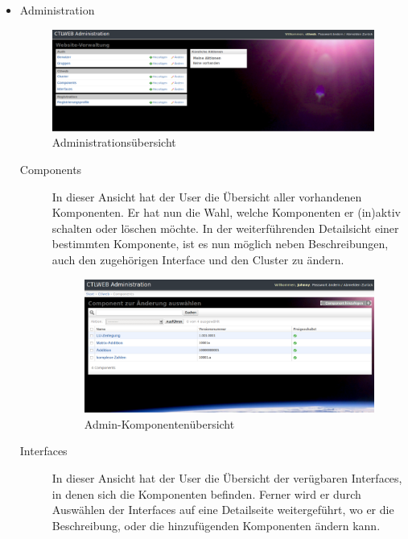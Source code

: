 \begin{itemize}
\begin{description}
      \end{description} 

      


    \item Administration

    \begin{figure}[!htp]      
    \includegraphics[width=0.8\linewidth]{bilder/ctlweb2.pdf}
      \caption{Administrationsübersicht}
      \label{fig:gui}
    \end{figure}

      \begin{description}
        \item[Components] In dieser Ansicht hat der User die Übersicht aller vorhandenen Komponenten. Er hat nun die Wahl, welche 
        Komponenten er (in)aktiv schalten oder löschen möchte. In der weiterführenden Detailsicht einer bestimmten Komponente, ist es nun möglich neben Beschreibungen, auch den zugehörigen Interface und den Cluster zu ändern. 

        \begin{figure}[!htp]
          \includegraphics[width=0.8\linewidth]{bilder/components.pdf}
          \caption{Admin-Komponentenübersicht}
          \label{fig:gui}
        \end{figure}
      \end{description}
      \begin{description}
        \item[Interfaces] In dieser Ansicht hat der User die Übersicht der verügbaren Interfaces, in denen sich die Komponenten befinden. Ferner wird er durch Auswählen der Interfaces auf eine Detailseite weitergeführt, wo er die Beschreibung, oder die hinzufügenden Komponenten ändern kann. 


\end{description}
\end{itemize}
